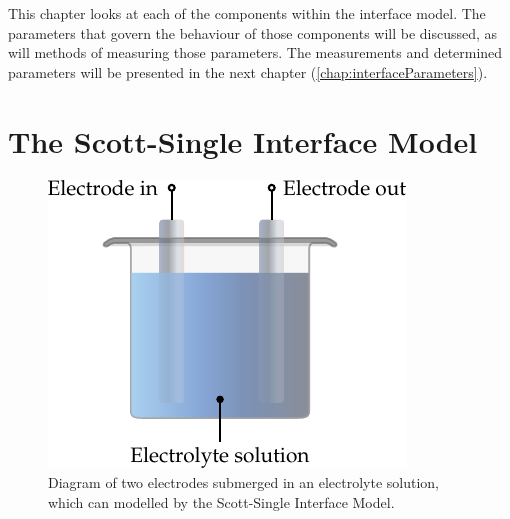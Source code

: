
This chapter looks at each of the components within the interface model.
The parameters that govern the behaviour of those components will be discussed, as will methods of measuring those parameters.
The measurements and determined parameters will be presented in the next chapter (\cref{chap:interfaceParameters}).


\section{The Scott-Single Interface Model}


  \begin{figure}
    \centering
    \includegraphics{content/pt2/07-InterfaceModel/graphics/electrode-electrolyte}
    \caption{\label{fig:electrode-electrolyte}Diagram of two electrodes submerged in an electrolyte solution, which can modelled by the Scott-Single Interface Model.}
  \end{figure}


